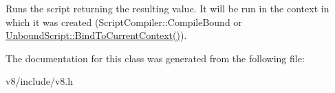 Runs the script returning the resulting value. It will be run in the context in which it was created (Script\+Compiler\+::\+Compile\+Bound or \mbox{\hyperlink{classv8_1_1UnboundScript_a0f3354dc71e3f831d10f6e82704a4c2b}{Unbound\+Script\+::\+Bind\+To\+Current\+Context()}}). 

The documentation for this class was generated from the following file\+:\begin{DoxyCompactItemize}
\item 
v8/include/v8.\+h\end{DoxyCompactItemize}
